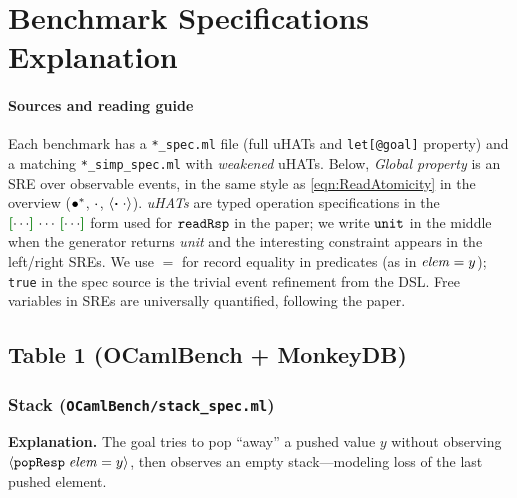 \section{Benchmark Specifications Explanation}\label{sec:bench-explain}

\newcommand{\SNegStar}[1]{{\bigl(\compA{#1}\bigr)^{\ast}}}
\newcommand{\SNegStarU}[2]{{\bigl(\anyA \setminus ({#1} \cup {#2})\bigr)^{\ast}}}
\newcommand{\SNegStarUU}[3]{{\bigl(\anyA \setminus ({#1} \cup {#2} \cup {#3})\bigr)^{\ast}}}
\newcommand{\SNegStarUUU}[4]{{\bigl(\anyA \setminus ({#1} \cup {#2} \cup {#3} \cup {#4})\bigr)^{\ast}}}

\paragraph{Sources and reading guide}
Each benchmark has a \texttt{*\_spec.ml} file (full uHATs and \texttt{let[@goal]} property) and a matching \texttt{*\_simp\_spec.ml} with \emph{weakened} uHATs.
Below, \emph{Global property} is an SRE over observable events, in the same style as \autoref{eqn:ReadAtomicity} in the overview (\({\bullet^*}\), \({\cdot}\), \({\langle} {\boldsymbol{{\tt \cdot}}\;{\cdot}} {\rangle}\)).
\emph{uHATs} are typed operation specifications in the \(\effLR{\cdots}\,\cdots\,\effLR{\cdots}\) form used for \(\boldsymbol{{\tt readRsp}}\) in the paper; we write \({\tt unit}\) in the middle when the generator returns \emph{unit} and the interesting constraint appears in the left/right SREs.
We use \(=\) for record equality in predicates (as in \(\mathit{elem} = y\)); \texttt{true} in the spec source is the trivial event refinement from the DSL\@.
Free variables in SREs are universally quantified, following the paper.

\subsection*{Table 1 (OCamlBench + MonkeyDB)}

\subsubsection*{Stack (\texttt{OCamlBench/stack\_spec.ml})}
\textbf{Explanation.}
The goal tries to pop ``away'' a pushed value \(y\) without observing \({\langle} {\boldsymbol{{\tt popResp}}\;{\mathit{elem} = y}} {\rangle}\), then observes an empty stack---modeling loss of the last pushed element.

